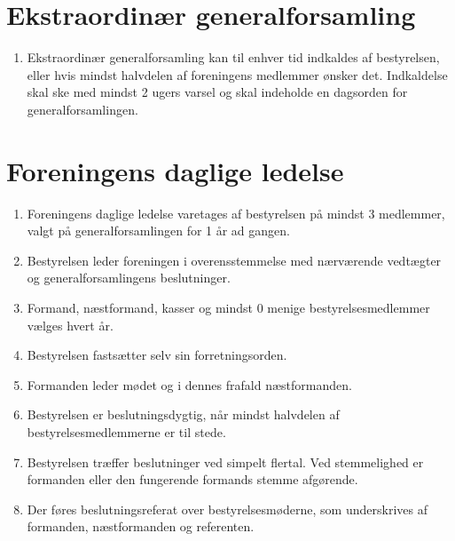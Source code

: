 \documentclass[a4paper, 10pt]{article}
\newenvironment{stykenum}{
  \begin{enumerate}[%
    label=Stk.~\arabic*:, ref=\textsection~\theenumi~Stk.~\arabic*, start=1]
}{\end{enumerate}}
\begin{document}
\section{Ekstraordinær generalforsamling}
\begin{stykenum}
    \item Ekstraordinær generalforsamling kan til enhver tid indkaldes af
        bestyrelsen, eller hvis mindst halvdelen af foreningens medlemmer ønsker
        det. Indkaldelse skal ske med mindst 2 ugers varsel og skal indeholde en
        dagsorden for generalforsamlingen.
\end{stykenum}

\section{Foreningens daglige ledelse}
\begin{stykenum}
    \item Foreningens daglige ledelse varetages af bestyrelsen på mindst 3
        medlemmer, valgt på generalforsamlingen for 1 år ad gangen.

    \item Bestyrelsen leder foreningen i overensstemmelse med nærværende
        vedtægter og generalforsamlingens beslutninger.

    \item Formand, næstformand, kasser og mindst 0 menige bestyrelsesmedlemmer
        vælges hvert år.

    \item Bestyrelsen fastsætter selv sin forretningsorden.

    \item Formanden leder mødet og i dennes frafald næstformanden.

    \item Bestyrelsen er beslutningsdygtig, når mindst halvdelen af
        bestyrelsesmedlemmerne er til stede.

    \item Bestyrelsen træffer beslutninger ved simpelt flertal. Ved stemmelighed
        er formanden eller den fungerende formands stemme afgørende.

    \item Der føres beslutningsreferat over bestyrelsesmøderne, som underskrives
        af formanden, næstformanden og referenten.
\end{stykenum}
\end{document}
